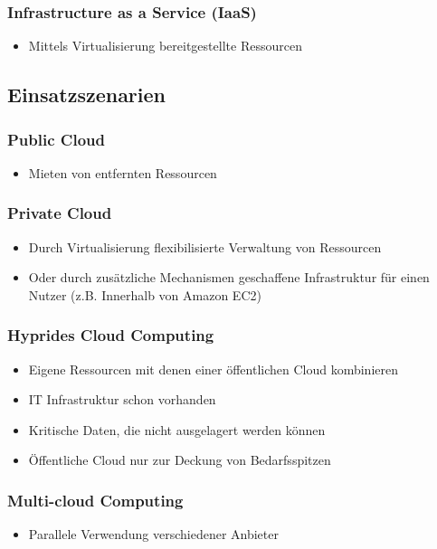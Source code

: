 \documentclass[a4paper,10pt]{scrreprt}
\begin{document}
	\subsubsection{Infrastructure as a Service (IaaS)}
	\begin{itemize}
		\item Mittels Virtualisierung bereitgestellte Ressourcen
	\end{itemize}
	\subsection{Einsatzszenarien}
		\subsubsection{Public Cloud}
	\begin{itemize}
		\item Mieten von entfernten Ressourcen
	\end{itemize}
	\subsubsection{Private Cloud}
	\begin{itemize}
		\item Durch Virtualisierung flexibilisierte Verwaltung von Ressourcen
		\item Oder durch zusätzliche Mechanismen geschaffene Infrastruktur für einen Nutzer (z.B. Innerhalb von Amazon EC2)
	\end{itemize}
	\subsubsection{Hyprides Cloud Computing}
	\begin{itemize}
		\item Eigene Ressourcen mit denen einer öffentlichen Cloud kombinieren
		\item IT Infrastruktur schon vorhanden
		\item Kritische Daten, die nicht ausgelagert werden können
		\item Öffentliche Cloud nur zur Deckung von Bedarfsspitzen
	\end{itemize}
	\subsubsection{Multi-cloud Computing}
	\begin{itemize}
		\item Parallele Verwendung verschiedener Anbieter
	\end{itemize}
\end{document}
